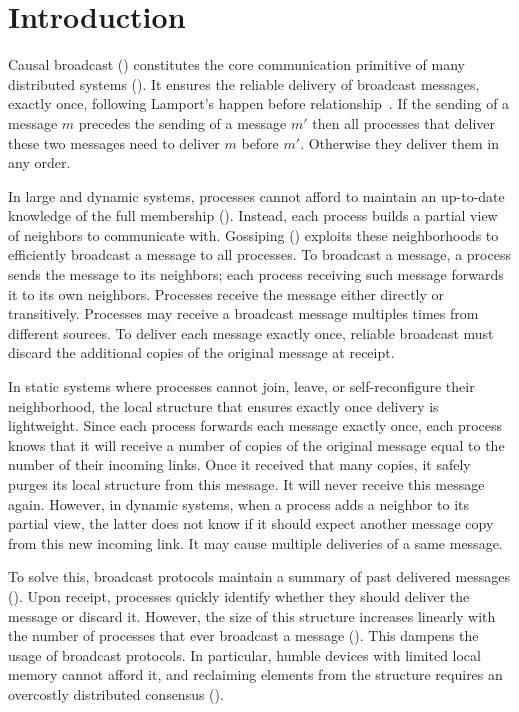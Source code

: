  
\section{Introduction}

Causal broadcast (\REF) constitutes the core communication primitive of many
distributed systems (\REF). It ensures the reliable delivery of broadcast
messages, exactly once, following Lamport's happen before
relationship~\cite{lamport1978time}. If the sending of a message $m$ precedes
the sending of a message $m'$ then all processes that deliver these two messages
need to deliver $m$ before $m'$. Otherwise they deliver them in any order.

In large and dynamic systems, processes cannot afford to maintain an up-to-date
knowledge of the full membership (\REF). Instead, each process builds a partial view of
neighbors to communicate with. Gossiping (\REF) exploits these neighborhoods to
efficiently broadcast a message to all processes. To broadcast a message, a
process sends the message to its neighbors; each process receiving such message
forwards it to its own neighbors. Processes receive the message either directly
or transitively. Processes may receive a broadcast message multiples times from
different sources.  To deliver each message exactly once, reliable broadcast
must discard the additional copies of the original message at receipt.

In static systems where processes cannot join, leave, or self-reconfigure their
neighborhood, the local structure that ensures exactly once delivery is
lightweight.  Since each process forwards each message exactly once, each
process knows that it will receive a number of copies of the original message
equal to the number of their incoming links. Once it received that many copies,
it safely purges its local structure from this message. It will never receive
this message again.  However, in dynamic systems, when a process adds a neighbor
to its partial view, the latter does not know if it should expect another
message copy from this new incoming link. It may cause multiple deliveries of a
same message.

To solve this, broadcast protocols maintain a summary of past delivered messages
(\REF). Upon receipt, processes quickly identify whether they should deliver the
message or discard it. However, the size of this structure increases linearly
with the number of processes that ever broadcast a message (\REF). This dampens
the usage of broadcast protocols. In particular, humble devices with limited
local memory cannot afford it, and reclaiming elements from the structure
requires an overcostly distributed consensus (\REF).

